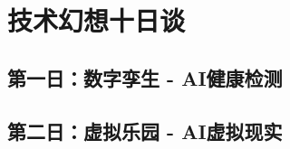 \setchapterpreamble[u]{\margintoc}
\chapter{技术幻想十日谈}

\section{第一日：数字孪生 - AI健康检测}

\section{第二日：虚拟乐园 - AI虚拟现实}

\section{}

\section{}

\section{}

\section{}

\section{}

\section{}

\section{}
